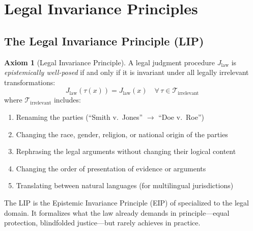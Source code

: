 \documentclass[12pt]{article}
\theoremstyle{definition}
\newtheorem{axiom}{Axiom}
\theoremstyle{remark}
\begin{document}
\section{Legal Invariance Principles}
\label{sec:invariance}

\subsection{The Legal Invariance Principle (LIP)}

\begin{axiom}[Legal Invariance Principle]
\label{axiom:lip}
A legal judgment procedure $J_{\text{law}}$ is \emph{epistemically well-posed} if and only if it is invariant under all legally irrelevant transformations:
\begin{equation}
J_{\text{law}}(\tau(x)) = J_{\text{law}}(x) \quad \forall\, \tau \in \mathcal{T}_{\text{irrelevant}}
\label{eq:lip}
\end{equation}
where $\mathcal{T}_{\text{irrelevant}}$ includes:
\begin{enumerate}
    \item Renaming the parties (``Smith v.\ Jones'' $\to$ ``Doe v.\ Roe'')
    \item Changing the race, gender, religion, or national origin of the parties
    \item Rephrasing the legal arguments without changing their logical content
    \item Changing the order of presentation of evidence or arguments
    \item Translating between natural languages (for multilingual jurisdictions)
\end{enumerate}
\end{axiom}

The LIP is the Epistemic Invariance Principle (EIP) of \cite{bond2025eip} specialized to the legal domain.  It formalizes what the law already demands in principle---equal protection, blindfolded justice---but rarely achieves in practice.
\end{document}
